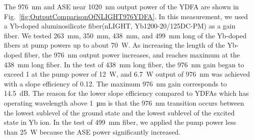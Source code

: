 \documentclass{osa-article}
\begin{document}
The \SI{976}{\nm} and ASE near \SI{1020}{\nm} output power of the YDFA are shown in Fig.~\ref{fig:OutputComparisonOfNLIGHT976YDFA}.
In this measurement, we used a Yb-doped aluminosilicate fiber(nLIGHT, Yb1200-20/125DC-PM) as a gain fiber.
We tested \SI{263}{\mm}, \SI{350}{\mm}, \SI{438}{\mm}, and \SI{499}{\mm} long of the Yb-doped fibers at pump powers up to about \SI{70}{\W}.
As increasing the length of the Yb-doped fiber, the \SI{976}{\nm} output power increases, and reaches maximum at the \SI{438}{\mm} long fiber.
In the test of \SI{438}{\mm} long fiber, the \SI{976}{\nm} gain began to exceed 1 at the pump power of \SI{12}{\W}, and \SI{6.7}{\W} output of \SI{976}{\nm} was achieved with a slope efficiency of 0.12.
The maximum \SI{976}{\nm} gain corresponds to \SI{14.5}{\dB}.
The reason for the lower slope efficiency compared to YDFAs which has operating wavelength above \SI{1}{\um} is that the \SI{976}{nm} transition occurs between the lowest sublevel of the ground state and the lowest sublevel of the excited state in Yb ion.
In the test of \SI{499}{\mm} fiber, we applied the pump power less than \SI{25}{\W} because the ASE power significantly increased.
\end{document}
